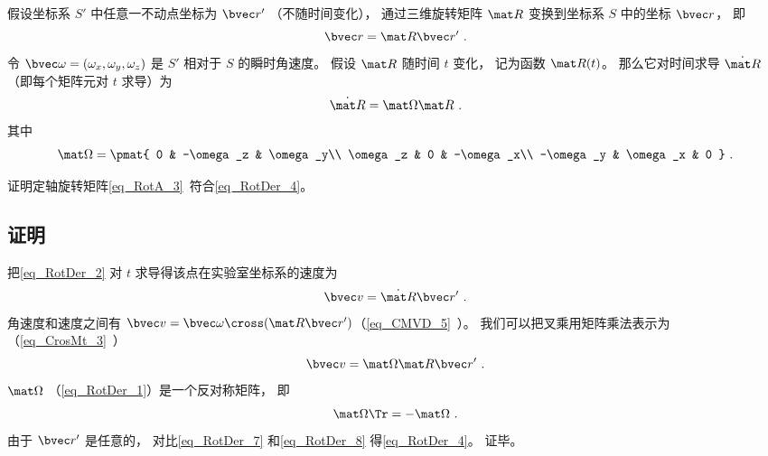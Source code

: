 

假设坐标系 $S'$ 中任意一不动点坐标为 $\bvec r'$ （不随时间变化）， 通过三维旋转矩阵 $\mat R$ 变换到坐标系 $S$ 中的坐标 $\bvec r$， 即
\begin{equation}\label{eq_RotDer_2}
\bvec r = \mat R \bvec r'~.
\end{equation}
令 $\bvec\omega = (\omega_x, \omega_y, \omega_z)$ 是 $S'$ 相对于 $S$ 的瞬时角速度。 假设 $\mat R$ 随时间 $t$ 变化， 记为函数 $\mat R(t)$。 那么它对时间求导 $\dot{\mat R}$ （即每个矩阵元对 $t$ 求导）为
\begin{equation}\label{eq_RotDer_4}
\dot{\mat R} = \mat \Omega \mat R~.
\end{equation}
其中
\begin{equation}\label{eq_RotDer_1}
\mat \Omega = \pmat{
0 & -\omega_z & \omega_y\\
\omega_z & 0 & -\omega_x\\
-\omega_y & \omega_x & 0
}~.
\end{equation}

\begin{exercise}{}\label{exe_RotDer_1}
证明定轴旋转矩阵\autoref{eq_RotA_3}~符合\autoref{eq_RotDer_4}。
\end{exercise}

\subsection{证明}
把\autoref{eq_RotDer_2} 对 $t$ 求导得该点在实验室坐标系的速度为
\begin{equation}\label{eq_RotDer_7}
\bvec v = \dot{\mat R} \bvec r'~.
\end{equation}
角速度和速度之间有 $\bvec v = \bvec \omega \cross (\mat R \bvec r')$（\autoref{eq_CMVD_5}~）。 我们可以把叉乘用矩阵乘法表示为（\autoref{eq_CrosMt_3}~）
\begin{equation}\label{eq_RotDer_8}
\bvec v = \mat\Omega \mat R \bvec r'~.
\end{equation}
$\mat\Omega$ （\autoref{eq_RotDer_1}）是一个反对称矩阵， 即
\begin{equation}
\mat \Omega\Tr = -\mat \Omega~.
\end{equation}
由于 $\bvec r'$ 是任意的， 对比\autoref{eq_RotDer_7} 和\autoref{eq_RotDer_8} 得\autoref{eq_RotDer_4}。 证毕。
